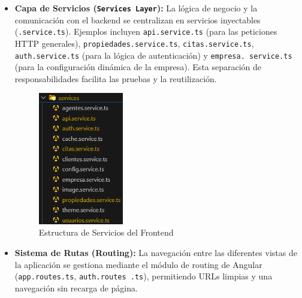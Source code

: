\begin{itemize}
    \item \textbf{Capa de Servicios (\texttt{Services Layer}):} La lógica de negocio y la comunicación con el backend se centralizan en servicios inyectables (\texttt{.service.ts}). Ejemplos incluyen \texttt{api.service.ts} (para las peticiones HTTP generales), \texttt{propiedades.service.ts}, \texttt{citas.service.ts}, \texttt{auth.service.ts} (para la lógica de autenticación) y \texttt{empresa. service.ts} (para la configuración dinámica de la empresa). Esta separación de responsabilidades facilita las pruebas y la reutilización.

    \begin{figure}[H]
        \begin{center}
            \includegraphics[width = 0.35\textwidth]{Figuras/directoriosfrontendservices.png}
        \end{center}
        \caption{\label{fig:directoriosfrontendservices} Estructura de Servicios del Frontend}
    \end{figure}

    \item \textbf{Sistema de Rutas (Routing):} La navegación entre las diferentes vistas de la aplicación se gestiona mediante el módulo de routing de Angular (\texttt{app.routes.ts}, \texttt{auth.routes .ts}), permitiendo URLs limpias y una navegación sin recarga de página.


\end{itemize}
